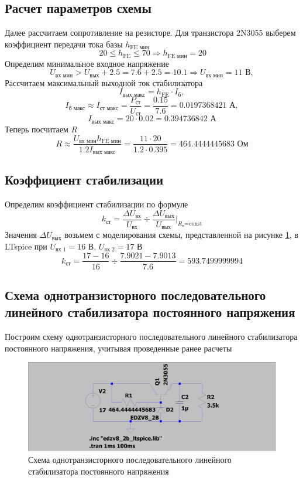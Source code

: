 \documentclass[a4paper, 12pt]{article}
\begin{document}
    
    \subsection{Расчет параметров схемы}
    Далее рассчитаем сопротивление на резисторе.
    Для транзистора 2N3055 выберем коэффициент передачи тока базы $h_{\text{FE мин}}$
    $$\,20\leq h_{\text{FE}}\leq70\Rightarrow h_{\text{FE мин}}=20$$
    Определим минимальное входное напряжение
    $$
    U_{\text{вх мин}}>U_{\text{вых}}+2.5=7.6+2.5=10.1\Rightarrow U_{\text{вх мин}}=11\text{ В},
    $$
    Рассчитаем максимальный выходной ток стабилизатора
    $$
    I_{\text{вых макс}}=h_{\text{FE}}\cdot I_{\text{б}},
    $$
    $$
    I_{\text{б макс}}\approx I_{\text{ст макс}}=\dfrac{P_{\text{ст}}}{U_{\text{ст}}}=\dfrac{0.15}{7.6}=0.0197368421\text{ А},
    $$
    $$
    I_{\text{вых макс}}=20\cdot0.02=0.394736842\text{ А}
    $$
    Теперь посчитаем $R$
    $$
    R\approx\dfrac{U_{\text{вх мин}}h_{\text{FE мин}}}{1.2I_{\text{вых макс}}}=\dfrac{11\cdot20}{1.2\cdot0.395}=464.4444445683\text{ Ом}
    $$


    \subsection{Коэффициент стабилизации}
    Определим коэффициент стабилизации по формуле
    $$
    k_{\text{ст}}=\dfrac{\Delta U_{\text{вх}}}{U_{\text{вх}}}\div\dfrac{\Delta U_{\text{вых}}}{U_{\text{вых}}}\bigg|_{R_\text{н}\text{=const}}
    $$
    Значения $\Delta U_{\text{вых}}$ возьмем с моделирования схемы, представленной на рисунке \ref{fig:2task_scheme_AC}, в LTspice
    при $U_{\text{вх 1}}=16$ В, $U_{\text{вх 2}}=17$ В
    $$
    k_{\text{ст}}=\dfrac{17-16}{16}\div\dfrac{7.9021-7.9013}{7.6}=593.7499999994
    $$


    \subsection{Схема однотранзисторного последовательного линейного стабилизатора постоянного напряжения}
    Построим схему однотранзисторного последовательного линейного стабилизатора постоянного напряжения, учитывая проведенные ранее расчеты
    \begin{figure}[H]
        \centering
        \includegraphics[scale=0.22]{2task_scheme_AC.png}
        \captionsetup{skip=0pt}
        \caption{Схема однотранзисторного последовательного линейного стабилизатора постоянного напряжения}
        \label{fig:2task_scheme_AC}
    \end{figure}
\end{document}
